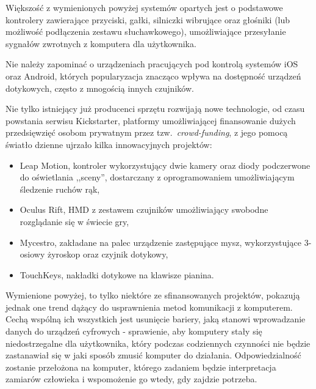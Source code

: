 Większość z wymienionych powyżej systemów opartych jest o podstawowe kontrolery zawierające przyciski, gałki, silniczki wibrujące oraz głośniki (lub możliwość podłączenia zestawu słuchawkowego), umożliwiające przesyłanie sygnałów zwrotnych z komputera dla użytkownika.

Nie należy zapominać o urządzeniach pracujących pod kontrolą systemów iOS oraz Android, których popularyzacja znacząco wpływa na dostępność urządzeń dotykowych, często z mnogością innych czujników.

Nie tylko istniejący już producenci sprzętu rozwijają nowe technologie, od czasu powstania serwisu Kickstarter, platformy umożliwiającej finansowanie dużych przedsięwzięć osobom prywatnym przez tzw.\ \textit{crowd-funding}, z jego pomocą światło dzienne ujrzało kilka innowacyjnych projektów:
\begin{itemize}
 \item Leap Motion, kontroler wykorzystujący dwie kamery oraz diody podczerwone do oświetlania ,,sceny'', dostarczany z oprogramowaniem umożliwiającym śledzenie ruchów rąk,
 \item Oculus Rift, HMD z zestawem czujników umożliwiający swobodne rozglądanie się w świecie gry,
 \item Mycestro, zakładane na palec urządzenie zastępujące mysz, wykorzystujące 3-osiowy żyroskop oraz czyjnik dotykowy,
 \item TouchKeys, nakładki dotykowe na klawisze pianina.
\end{itemize}

Wymienione powyżej, to tylko niektóre ze sfinansowanych projektów, pokazują jednak one trend dążący do usprawnienia metod komunikacji z komputerem. Cechą wspólną ich wszystkich jest usunięcie bariery, jaką stanowi wprowadzanie danych do urządzeń cyfrowych - sprawienie, aby komputery stały się niedostrzegalne dla użytkownika, który podczas codziennych czynności nie będzie zastanawiał się w jaki sposób zmusić komputer do działania. Odpowiedzialność zostanie przełożona na komputer, którego zadaniem będzie interpretacja zamiarów człowieka i wspomożenie go wtedy, gdy zajdzie potrzeba.